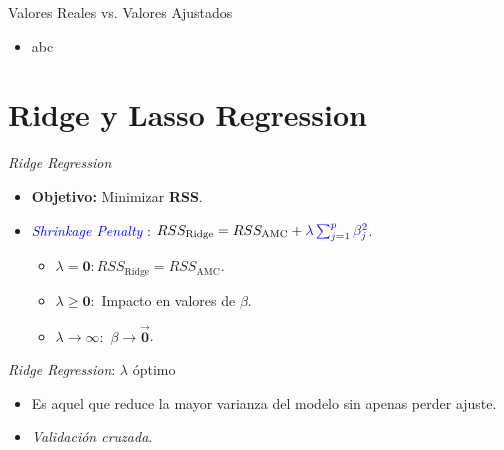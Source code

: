 \documentclass[11pt]{beamer}
\newcommand{\B}{\beta}
\begin{document}
\begin{frame}{Valores Reales vs. Valores Ajustados}
	\begin{itemize}
		\item abc
	\end{itemize}
\end{frame}



\section{Ridge y Lasso Regression}

\begin{frame}{\textit{Ridge Regression}}
	\begin{itemize}
		\item \textbf{Objetivo:} Minimizar \textbf{RSS}.
		\pause
		\item \textcolor{blue}{\textit{Shrinkage Penalty}} : $RSS_{\text{Ridge}} = RSS_{\text{AMC}} + \textcolor{blue}{\lambda \sum^p_{j=1} \beta_j^2}$.
		\begin{itemize}
			\item $\lambda = \mathbf{0}: RSS_{\text{Ridge}} = RSS_{\text{AMC}}$.
			\item $\lambda \geq \mathbf{0}:$ Impacto en valores de $\B$.
			\item $\lambda \to \mathbf{\infty}:$ $\B \to \vec{\mathbf{0}}$.
		\end{itemize}
	\end{itemize}
\end{frame}

\begin{frame}{\textit{Ridge Regression}: $\lambda$ óptimo}
	\begin{itemize}
		\item Es aquel que reduce la mayor varianza del modelo sin apenas perder ajuste.
		\pause
		\item \textit{Validación cruzada}.
	\end{itemize}
\end{frame}
\end{document}
